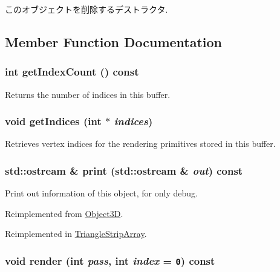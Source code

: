 このオブジェクトを削除するデストラクタ. 

\subsection{Member Function Documentation}
\hypertarget{classm3g_1_1IndexBuffer_fe9ae2993ebcdb93d5ff26d57c81b73e}{
\subsubsection[{getIndexCount}]{\setlength{\rightskip}{0pt plus 5cm}int getIndexCount () const}}
\label{classm3g_1_1IndexBuffer_fe9ae2993ebcdb93d5ff26d57c81b73e}


Returns the number of indices in this buffer. \hypertarget{classm3g_1_1IndexBuffer_650953afac45099025a524ab160b911f}{
\subsubsection[{getIndices}]{\setlength{\rightskip}{0pt plus 5cm}void getIndices (int $\ast$ {\em indices})}}
\label{classm3g_1_1IndexBuffer_650953afac45099025a524ab160b911f}


Retrieves vertex indices for the rendering primitives stored in this buffer. \hypertarget{classm3g_1_1IndexBuffer_6fea17fa1532df3794f8cb39cb4f911f}{
\subsubsection[{print}]{\setlength{\rightskip}{0pt plus 5cm}std::ostream \& print (std::ostream \& {\em out}) const}}
\label{classm3g_1_1IndexBuffer_6fea17fa1532df3794f8cb39cb4f911f}


Print out information of this object, for only debug. 

Reimplemented from \hyperlink{classm3g_1_1Object3D_6fea17fa1532df3794f8cb39cb4f911f}{Object3D}.

Reimplemented in \hyperlink{classm3g_1_1TriangleStripArray_6fea17fa1532df3794f8cb39cb4f911f}{TriangleStripArray}.\hypertarget{classm3g_1_1IndexBuffer_1efcb1973989d9963d5bd6d03065d389}{
\subsubsection[{render}]{\setlength{\rightskip}{0pt plus 5cm}void render (int {\em pass}, \/  int {\em index} = {\tt 0}) const}}
\label{classm3g_1_1IndexBuffer_1efcb1973989d9963d5bd6d03065d389}


